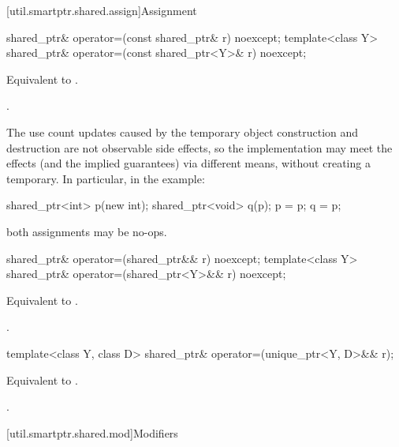 [util.smartptr.shared.assign]{Assignment}

%
\begin{itemdecl}
shared_ptr& operator=(const shared_ptr& r) noexcept;
template<class Y> shared_ptr& operator=(const shared_ptr<Y>& r) noexcept;
\end{itemdecl}

\begin{itemdescr}
\pnum\effects  Equivalent to .

\pnum\returns  {}.

\pnum \begin{note}
The use count updates caused by the temporary object
construction and destruction are not observable side
effects, so the implementation may meet the effects (and the
implied guarantees) via different means, without creating a
temporary. In particular, in the example:
\begin{codeblock}
shared_ptr<int> p(new int);
shared_ptr<void> q(p);
p = p;
q = p;
\end{codeblock}
both assignments may be no-ops. \end{note}
\end{itemdescr}

%
\begin{itemdecl}
shared_ptr& operator=(shared_ptr&& r) noexcept;
template<class Y> shared_ptr& operator=(shared_ptr<Y>&& r) noexcept;
\end{itemdecl}

\begin{itemdescr}
\pnum
\effects Equivalent to .

\pnum
\returns {}.
\end{itemdescr}

%
\begin{itemdecl}
template<class Y, class D> shared_ptr& operator=(unique_ptr<Y, D>&& r);
\end{itemdecl}

\begin{itemdescr}
\pnum
\effects Equivalent to .

\pnum
\returns {}.
\end{itemdescr}

[util.smartptr.shared.mod]{Modifiers}


